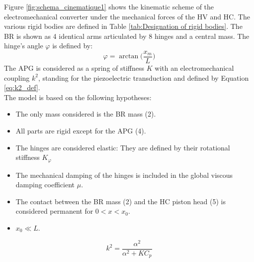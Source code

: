 \documentclass[3p,twocolumn,preprint]{elsarticle}
\begin{document}
Figure \ref{fig:schema_cinematique1} shows the kinematic scheme of the electromechanical converter under the mechanical forces of the HV and HC. The various rigid bodies are defined in Table \ref{tab:Designation of rigid bodies}. The BR is shown as 4 identical arms articulated by 8 hinges and a central mass. The hinge's angle $\varphi$ is defined by:
\begin{equation}
	\varphi = \arctan\biggl(\dfrac{x_m}{L}\biggr)
	\label{eq:phi_definition}
\end{equation}
The APG is considered as a spring of stiffness $K$ with an electromechanical coupling $k^2$, standing for the piezoelectric transduction and defined by Equation \ref{eq:k2_def}.\\
The model is based on the following hypotheses:
\begin{itemize}
	\item The only mass considered is the BR mass (2).
	\item All parts are rigid except for the APG (4).
	\item The hinges are considered elastic: They are defined by their rotational stiffness $K_{\varphi}$
	\item The mechanical damping of the hinges is included in the global viscous damping coefficient $\mu$.
	\item The contact between the BR mass (2) and the HC piston head (5) is considered permanent for $0 < x < x_0$.
	\item \mbox{$x_0 \ll L$}. 
\end{itemize}
\begin{equation}
	k^2 = \dfrac{\alpha^2}{\alpha^2 +  K C_p}
	\label{eq:k2_def}
\end{equation}
\begin{table}[!htbp]
\centering
{}
\caption{Definition of figure \ref{fig:schema_cinematique1} bodies}
\label{tab:Designation of rigid bodies}
\end{table}
\end{document}
